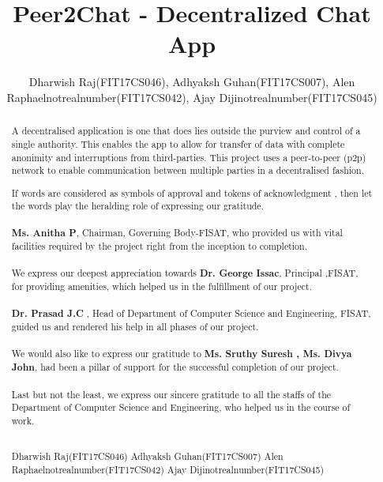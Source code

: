 \documentclass{fisatproject}
\title{Peer2Chat - Decentralized Chat App }
\author{Dharwish Raj(FIT17CS046), Adhyaksh Guhan(FIT17CS007), Alen Raphaelnotrealnumber(FIT17CS042), Ajay Dijinotrealnumber(FIT17CS045)}
\begin{document}
\maketitle

\makecert

\newpage
\setcounter{page}{1}
\renewcommand\abstractname{ABSTRACT}
\begin{abstract}
\vspace{5cm}
A decentralised application is one that does lies outside the purview and control of a single authority. This enables the app to allow for transfer of data with complete anonimity and interruptions from third-parties. This project uses a peer-to-peer (p2p) network to enable communication between multiple parties in a decentralised fashion.
\end{abstract}


\newpage
\renewcommand\abstractname{ACKNOWLEDGMENT}
\begin{abstract}
\vspace{5cm}
If words are considered as symbols of approval and tokens of acknowledgment , then let the words play the heralding role of expressing our gratitude. \\ \\
 \textbf{Ms. Anitha P}, Chairman, Governing Body-FISAT, who provided us with vital facilities required by the project right from the inception to completion. \\ \\
 We express our deepest appreciation towards \textbf{Dr. George Issac}, Principal ,FISAT, for providing amenities, which helped us in the fulfillment of our project. \\ \\
 \textbf{Dr. Prasad J.C} , Head of Department of Computer Science and Engineering, FISAT, guided us  and rendered his help in all phases of our project. \\ \\
 We would also like to express our gratitude to \textbf{Ms. Sruthy Suresh , Ms. Divya John}, had been a pillar of support for the successful completion of our project. \\ \\
 Last but not the least, we express our sincere gratitude to all the staffs of the Department of Computer Science  and Engineering, who helped us in the course of work. \\ \\

\vspace{1cm}
\begin{flushright}
Dharwish Raj(FIT17CS046)
Adhyaksh Guhan(FIT17CS007)
Alen Raphaelnotrealnumber(FIT17CS042)
Ajay Dijinotrealnumber(FIT17CS045)
\end{flushright}
\end{abstract}
\newpage
\end{document}
